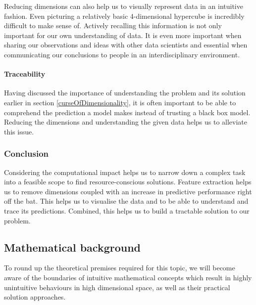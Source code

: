 Reducing dimensions can also help us to visually represent data in an intuitive fashion.
Even picturing a relatively basic 4-dimensional hypercube is incredibly difficult to make sense of.
Actively recalling this information is not only important for our own understanding of data. It is even more important when sharing our observations and ideas with other data scientists and essential when communicating our conclusions to people in an interdisciplinary environment. \cite{PythonMachineLearningCh8}

\paragraph{Traceability}

Having discussed the importance of understanding the problem and its solution earlier in section \ref{curseOfDimensionality}, it is often important to be able to comprehend the prediction a model makes instead of trusting a black box model. 
Reducing the dimensions and understanding the given data helps us to alleviate this issue.

\subsubsection{Conclusion}

Considering the computational impact helps us to narrow down a complex task into a feasible scope to find resource-conscious solutions.
Feature extraction helps us to remove dimensions coupled with an increase in predictive performance right off the bat.
This helps us to visualise the data and to be able to understand and trace its predictions.
Combined, this helps us to build a tractable solution to our problem.

\clearpage


\subsection{Mathematical background}

To round up the theoretical premises required for this topic, we will become aware of the boundaries of intuitive mathematical concepts which result in highly unintuitive behaviours in high dimensional space, as well as their practical solution approaches.
